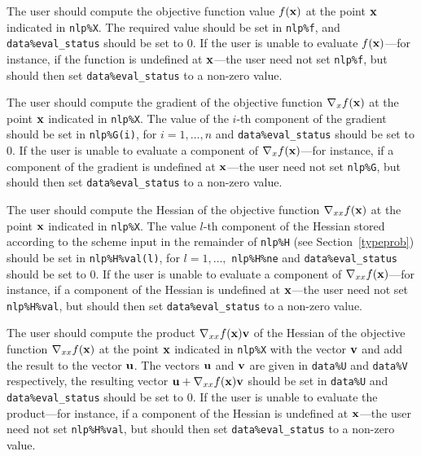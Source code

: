 \documentclass{galahad}
\begin{document}
\begin{description}
 The user should compute the objective function
     value $f({\mathbf{x}})$ at the point ${\mathbf{x}}$ indicated in {\tt nlp\%X}.
     The required value should be set in {\tt nlp\%f}, and
     {\tt data\%eval\_status} should be set to 0. If the user is
     unable to evaluate $f({\mathbf{x}})$---for instance, if the function is
     undefined at ${\mathbf{x}}$---the user need not set {\tt nlp\%f}, but
     should then set {\tt data\%eval\_status} to a non-zero value.

 The user should compute the gradient
     of the objective function $\nabla_x f({\mathbf{x}})$ at the point ${\mathbf{x}}$
     indicated in {\tt nlp\%X}.
     The value of the $i$-th component of the gradient should be set
     in {\tt nlp\%G(i)},      for $i = 1, \ldots, n$ and
     {\tt data\%eval\_status} should be set to 0. If the user is
     unable to evaluate a component of $\nabla_x f({\mathbf{x}})$---for instance,
     if a component of the gradient is
     undefined at ${\mathbf{x}}$---the user need not set {\tt nlp\%G}, but
     should then set {\tt data\%eval\_status} to a non-zero value.

 The user should compute the Hessian
     of the objective function $\nabla_{xx} f({\mathbf{x}})$ at the point ${\mathbf{x}}$
     indicated in {\tt nlp\%X}.
     The value $l$-th component of the Hessian stored according to the
     scheme input in the remainder of {\tt nlp\%H} (see Section~\ref{typeprob})
     should be set in {\tt nlp\%H\%val(l)},
     for $l = 1, \ldots,$ {\tt  nlp\%H\%ne} and
     {\tt data\%eval\_status} should be set to 0. If the user is
     unable to evaluate a component of $\nabla_{xx} f({\mathbf{x}})$---for instance,
     if a component of the Hessian is
     undefined at ${\mathbf{x}}$---the user need not set {\tt nlp\%H\%val}, but
     should then set {\tt data\%eval\_status} to a non-zero value.

 The user should compute the product
     $\nabla_{xx} f({\mathbf{x}}){\mathbf{v}}$ of the Hessian
     of the objective function $\nabla_{xx} f({\mathbf{x}})$ at the point ${\mathbf{x}}$
     indicated in {\tt nlp\%X} with the vector ${\mathbf{v}}$ and add the result to
     the vector ${\mathbf{u}}$. The vectors ${\mathbf{u}}$ and ${\mathbf{v}}$ are given in
     {\tt data\%U} and {\tt data\%V} respectively, the resulting
     vector ${\mathbf{u}} + \nabla_{xx} f({\mathbf{x}}){\mathbf{v}}$ should be set in {\tt data\%U}
     and  {\tt data\%eval\_status} should be set to 0. If the user is
     unable to evaluate the product---for instance,
     if a component of the Hessian is
     undefined at ${\mathbf{x}}$---the user need not set {\tt nlp\%H\%val}, but
     should then set {\tt data\%eval\_status} to a non-zero value.


\end{description}
\end{document}

